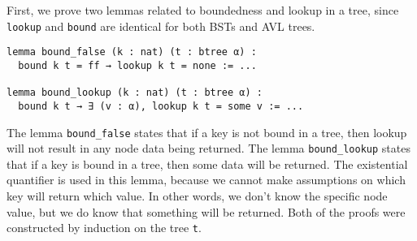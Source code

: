 First, we prove two lemmas related to boundedness and lookup in a tree, since \lstinline{lookup} and \lstinline{bound} are identical for both BSTs and AVL trees.

\begin{lstlisting}
lemma bound_false (k : nat) (t : btree α) :
  bound k t = ff → lookup k t = none := ...

lemma bound_lookup (k : nat) (t : btree α) :
  bound k t → ∃ (v : α), lookup k t = some v := ...
\end{lstlisting}

The lemma \lstinline{bound_false} states that if a key is not bound in a tree, then lookup will not result in any node data being returned. The lemma \lstinline{bound_lookup} states that if a key is bound in a tree, then some data will be returned. The existential quantifier is used in this lemma, because we cannot make assumptions on which key will return which value. In other words, we don't know the specific node value, but we do know that something will be returned. Both of the proofs were constructed by induction on the tree \lstinline{t}.